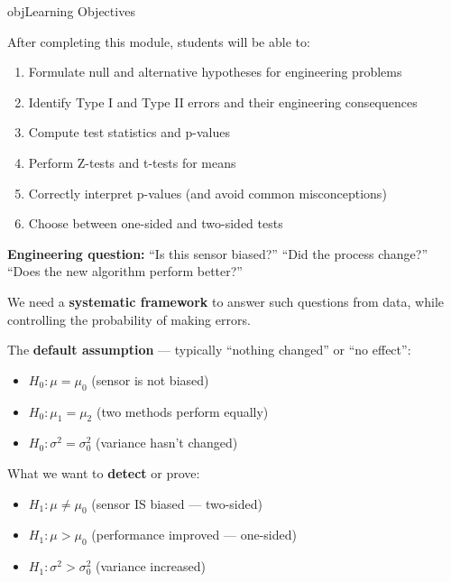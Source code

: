 \begin{PSbox}[unbreakable]{obj}{Learning Objectives}

After completing this module, students will be able to:

\begin{enumerate}
\def\labelenumi{\arabic{enumi}.}
\tightlist
\item
  Formulate null and alternative hypotheses for engineering problems
\item
  Identify Type I and Type II errors and their engineering consequences
\item
  Compute test statistics and p-values
\item
  Perform Z-tests and t-tests for means
\item
  Correctly interpret p-values (and avoid common misconceptions)
\item
  Choose between one-sided and two-sided tests
\end{enumerate}

\end{PSbox}


\textbf{Engineering question:} ``Is this sensor biased?'' ``Did the process change?'' ``Does the new algorithm perform better?''

We need a \textbf{systematic framework} to answer such questions from data, while controlling the probability of making errors.



The \textbf{default assumption} — typically ``nothing changed'' or ``no effect'':

\begin{itemize}
\tightlist
\item
  $H_{0}: \mu = \mu_{0}$ (sensor is not biased)
\item
  $H_{0}: \mu_{1} = \mu_{2}$ (two methods perform equally)
\item
  $H_{0}: \sigma^{2} = \sigma_{0}^{2}$ (variance hasn’t changed)
\end{itemize}


What we want to \textbf{detect} or prove:

\begin{itemize}
\tightlist
\item
  $H_{1}: \mu \ne \mu_{0}$ (sensor IS biased — two-sided)
\item
  $H_{1}: \mu > \mu_{0}$ (performance improved — one-sided)
\item
  $H_{1}: \sigma^{2} > \sigma_{0}^{2}$ (variance increased)
\end{itemize}

